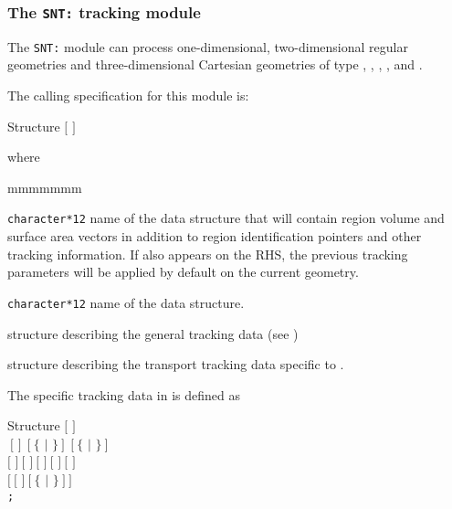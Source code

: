 \subsubsection{The {\tt SNT:} tracking module}\label{sect:SNData}

The {\tt SNT:} module can process one-dimensional, two-dimensional regular geometries and three-dimensional Cartesian geometries
of type , , , ,  and .

\vskip 0.2cm

The calling specification for this module is:

\begin{DataStructure}{Structure }
\moc{:=}  $[$  $]$ 
 \moc{::}   
\end{DataStructure}

\noindent  where
\begin{ListeDeDescription}{mmmmmmm}

\item[\dusa{TRKNAM}] {\tt character*12} name of the  data
structure that will contain region volume and surface area vectors in
addition to region identification pointers and other tracking information.
If  also appears on the RHS, the previous tracking 
parameters will be applied by default on the current geometry.

\item[\dusa{GEONAM}] {\tt character*12} name of the  data
structure.

\item[\dstr{desctrack}] structure describing the general tracking data (see
)

\item[\dstr{descsn}] structure describing the transport tracking data
specific to .

\end{ListeDeDescription}

\vskip 0.2cm

The  specific tracking data in  is defined as

\begin{DataStructure}{Structure }
$[$   $]$ \\
  $~[$   $]~~[~\{$  $|$  $\}~]
~~[~\{$    $|$  $\}~]$\\
$[$   $]~[$   $]~
[$   $]~[$    $]~
[$   $]$ \\
$[~[$   $]~[~\{$  $|$  $\}~]~]$ \\
{\tt ;}
\end{DataStructure}

